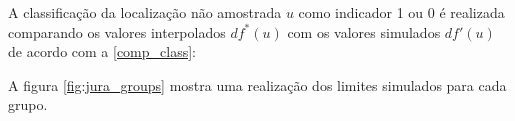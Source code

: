 \begin{figure}[H]
     \hspace{1em}
\end{figure}

A classificação da localização não amostrada $u$ como indicador 1 ou 0 é realizada comparando os valores interpolados $df^{*}(u)$ com os valores simulados $df'(u)$ de acordo com a \autoref{comp_class}:

A figura \autoref{fig:jura_groups} mostra uma realização dos limites simulados para cada grupo.

